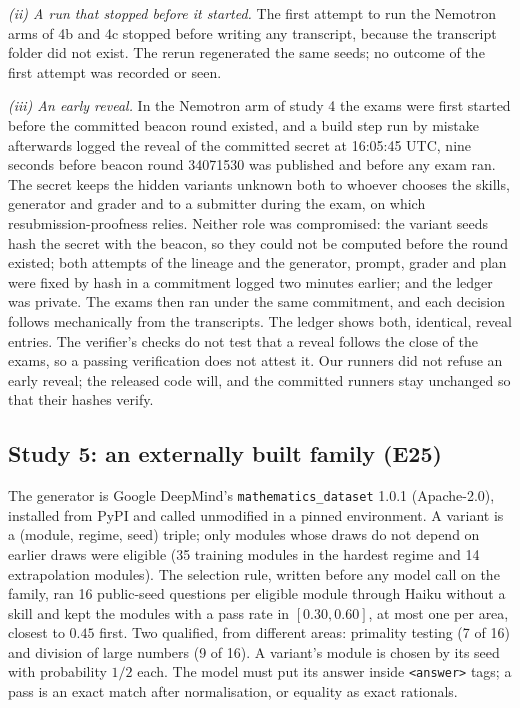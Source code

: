 \emph{(ii) A run that stopped before it started.} The first attempt to run the Nemotron arms of 4b and 4c stopped before writing any transcript, because the transcript folder did not exist. The rerun regenerated the same seeds; no outcome of the first attempt was recorded or seen.

\emph{(iii) An early reveal.} In the Nemotron arm of study 4 the exams were first started before the committed beacon round existed, and a build step run by mistake afterwards logged the reveal of the committed secret at 16:05:45 UTC, nine seconds before beacon round 34071530 was published and before any exam ran. The secret keeps the hidden variants unknown both to whoever chooses the skills, generator and grader and to a submitter during the exam, on which resubmission-proofness relies. Neither role was compromised: the variant seeds hash the secret with the beacon, so they could not be computed before the round existed; both attempts of the lineage and the generator, prompt, grader and plan were fixed by hash in a commitment logged two minutes earlier; and the ledger was private. The exams then ran under the same commitment, and each decision follows mechanically from the transcripts. The ledger shows both, identical, reveal entries. The verifier's checks do not test that a reveal follows the close of the exams, so a passing verification does not attest it. Our runners did not refuse an early reveal; the released code will, and the committed runners stay unchanged so that their hashes verify.

\subsection{Study 5: an externally built family (E25)}
\label{app:study5}
 The generator is Google DeepMind's \texttt{mathematics\_dataset} 1.0.1 \citep{saxton2019analysing} (Apache-2.0), installed from PyPI and called unmodified in a pinned environment. A variant is a (module, regime, seed) triple; only modules whose draws do not depend on earlier draws were eligible (35 training modules in the hardest regime and 14 extrapolation modules). The selection rule, written before any model call on the family, ran 16 public-seed questions per eligible module through Haiku without a skill and kept the modules with a pass rate in $[0.30,0.60]$, at most one per area, closest to $0.45$ first. Two qualified, from different areas: primality testing (7 of 16) and division of large numbers (9 of 16). A variant's module is chosen by its seed with probability $1/2$ each. The model must put its answer inside \texttt{<answer>} tags; a pass is an exact match after normalisation, or equality as exact rationals.

